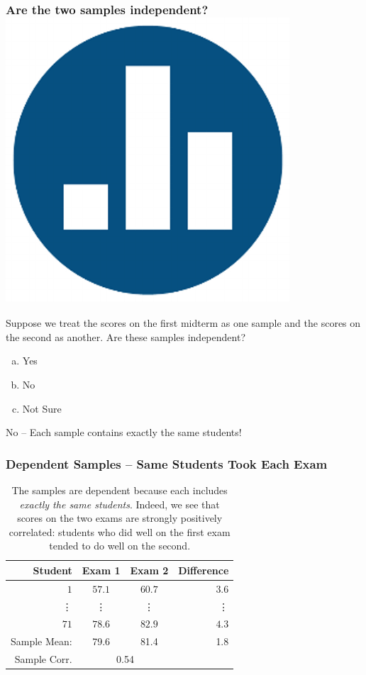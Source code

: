 \begin{frame}
\frametitle{Are the two samples independent? \hfill \includegraphics[scale = 0.05]{./images/clicker}}
Suppose we treat the scores on the first midterm as one sample and the scores on the second as another. Are these samples independent?

\begin{enumerate}[(a)]
	\item Yes
	\item No
	\item Not Sure
\end{enumerate}

\pause
\alert{No -- Each sample contains exactly the same students!}

\end{frame}
\begin{frame}
\frametitle{Dependent Samples -- Same Students Took Each Exam}
%
\begin{table}[!tbp]
\begin{center}
\begin{tabular}{rccr}
\hline\hline
\multicolumn{1}{r}{Student}&\multicolumn{1}{c}{Exam 1}&\multicolumn{1}{c}{Exam 2}&\multicolumn{1}{r}{Difference}\tabularnewline
\hline
$ 1$&$57.1$&$60.7$&$  3.6$\tabularnewline
\vdots&\vdots&\vdots&\vdots\\
$71$&$78.6$&$82.9$&$  4.3$\tabularnewline
\hline
Sample Mean: & 79.6 & 81.4  &1.8\\
\alert{Sample Corr.} & \multicolumn{2}{c}{\alert{0.54}}&\\
\hline
\end{tabular}
\caption{The samples are dependent because each includes \emph{exactly the same students}. Indeed, we see that scores on the two exams are strongly positively correlated: students who did well on the first exam tended to do well on the second.}
\end{center}
\end{table}

\end{frame}
